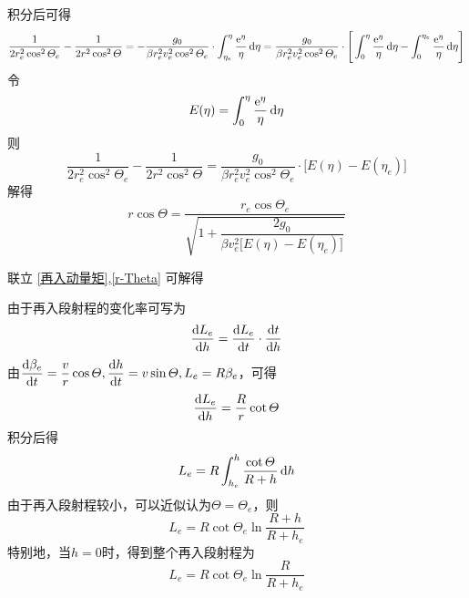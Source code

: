 积分后可得
\begin{equation}
	\dfrac{1}{2r_e^2\cos^2 \varTheta_e} - \dfrac{1}{2r^2 \cos^2 \varTheta} = - \dfrac{g_0}{\beta r_e^2v_e^2 \cos^2 \varTheta_e}\cdot \int_{\eta_e}^{\eta} \dfrac{{\rm{e}}^\eta}{\eta}\, {\rm{d}} \eta = \dfrac{g_0}{\beta r_e^2v_e^2 \cos^2 \varTheta_e}\cdot  \Bigg[\int_{0}^{\eta}\dfrac{{\rm{e}}^\eta}{\eta}\, {\rm{d}} \eta - \int_{0}^{\eta_e}\dfrac{{\rm{e}}^\eta}{\eta}\, {\rm{d}} \eta \Bigg]
\end{equation}
令
\begin{equation}
	E(\eta) = \int_0^\eta \dfrac{{\rm{e}}^\eta}{\eta}\, {\rm{d}} \eta
\end{equation}
则
\begin{equation}
	\dfrac{1}{2r_e^2\cos^2 \varTheta_e} - \dfrac{1}{2r^2 \cos^2 \varTheta} = \dfrac{g_0}{\beta r_e^2v_e^2 \cos^2 \varTheta_e}\cdot\big[E(\eta) - E(\eta_e)\big]
\end{equation}
解得
\begin{equation}
	r \cos \varTheta = \dfrac{r_e \cos \varTheta_e}{\sqrt{1 + \dfrac{2g_0}{\beta v_e^2\big[E(\eta) - E(\eta_e)\big]}}}
	\label{r-Theta}
\end{equation}

联立 \eqref{再入动量矩},\eqref{r-Theta} 可解得



\sssection[射程的近似计算]

由于再入段射程的变化率可写为
\begin{equation}
	\dfrac{{\rm{d}} L_e}{{\rm{d}} h} = \dfrac{{\rm{d}} L_e}{{\rm{d}} t} \cdot \dfrac{{\rm{d}} t}{{\rm{d}} h}
\end{equation}
由$\dfrac{{\rm{d}} \beta_e}{{\rm{d}} t} = \dfrac{v}{r} \cos \varTheta, \dfrac{{\rm{d}} h}{{\rm{d}} t} = v \sin \varTheta, L_e = R \beta_e$，可得
\begin{equation}
	\dfrac{{\rm{d}} L_e}{{\rm{d}} h} = \dfrac{R}{r} \cot \varTheta
\end{equation}
积分后得
 \begin{equation}
 	L_e = R \int_{h_e}^{h} \dfrac{\cot \varTheta}{R + h} \, {\rm{d}} h
 \end{equation}
由于再入段射程较小，可以近似认为$\varTheta = \varTheta_e$，则
\begin{equation}
	L_e = R \cot\varTheta_e \ln \dfrac{R + h}{R + h_e}
\end{equation}
特别地，当$h = 0$时，得到整个再入段射程为
\begin{equation}
	L_e = R \cot \varTheta_e \ln \dfrac{R}{R + h_e}
\end{equation}

